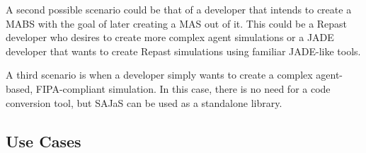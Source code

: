 A second possible scenario could be that of a developer that intends to create a MABS with the goal of later creating a MAS out of it. This could be a Repast developer who desires to create more complex agent simulations or a JADE developer that wants to create Repast simulations using familiar JADE-like tools.

A third scenario is when a developer simply wants to create a complex agent-based, FIPA-compliant simulation. In this case, there is no need for a code conversion tool, but SAJaS can be used as a standalone library.

\subsection{Use Cases}

